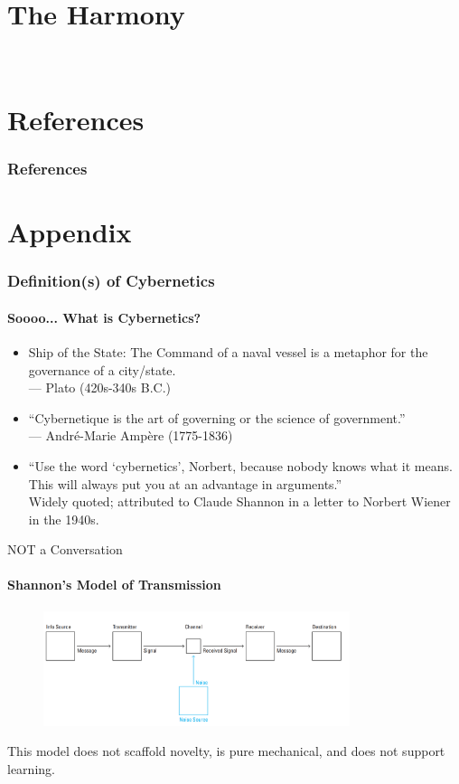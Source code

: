 \documentclass[
	11pt,
	aspectratio=169,
]{beamer}
\begin{document}
    \section{The Harmony}
        \


\section{References}
	\begin{frame}[allowframebreaks]
		\frametitle{References}
		\printbibliography
	\end{frame}

\section*{Appendix}
	\begin{frame}
		\frametitle{Definition(s) of Cybernetics}
		\framesubtitle{Soooo... What is Cybernetics?}
		\begin{itemize}
			\item<1->Ship of the State: The Command of a naval vessel is a metaphor for the governance of a city/state.\\
			--- Plato (420s-340s B.C.)
			\item<2->``Cybernetique is the art of governing or the science of government.''\\
			--- André-Marie Ampère (1775-1836)
			\item<3->``Use the word ‘cybernetics’, Norbert, because nobody knows what it means. This will always put you at an advantage in arguments.''\\
			Widely quoted; attributed to Claude Shannon in a letter to Norbert Wiener in the 1940s.
		\end{itemize}
	\end{frame}
	\begin{frame}{NOT a Conversation}
        \framesubtitle{Shannon's Model of Transmission}
        \begin{figure}
            \centering\includegraphics[width=0.8\textwidth]{resources/transmission.PNG}
        \end{figure}
        This model does not scaffold novelty, is pure mechanical, and does not support learning.
    \end{frame}
\end{document}
